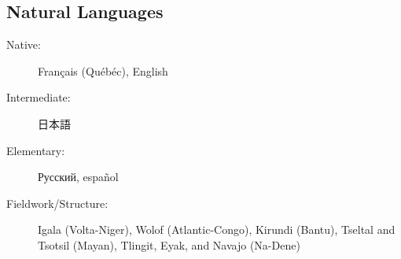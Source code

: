 \documentclass[margin,line]{resume}
\begin{document}
\begin{resume}
	\section{\mysidestyle Natural Languages}\vspace{2mm}
	\begin{description}
		\item[Native:] Français (Québéc), English
		\item[Intermediate:] \begin{CJK}{UTF8}{min}日本語\end{CJK}
		\item[Elementary:] Русский, español
		\item[Fieldwork/Structure:] Igala (Volta-Niger), Wolof (Atlantic-Congo), Kirundi (Bantu),
		      Tseltal and Tsotsil (Mayan), Tlingit, Eyak, and Navajo (Na-Dene)%
	\end{description}

	\BgThispage

\end{resume}
\end{document}
